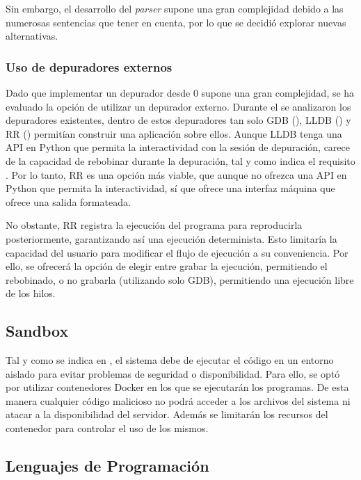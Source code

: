 Sin embargo, el desarrollo del \textit{\gls{parser}} supone una gran complejidad debido a las numerosas sentencias que tener en cuenta, por lo que se decidió explorar nuevas alternativas.

\subsubsection{Uso de depuradores externos} \label{sec:depuradores-externos}

Dado que implementar un depurador desde 0 supone una gran complejidad, se ha evaluado la opción de utilizar un depurador externo. Durante el  se analizaron los depuradores existentes, dentro de estos depuradores tan solo GDB (), LLDB () y RR () permitían construir una aplicación sobre ellos. Aunque LLDB tenga una API en Python que permita la interactividad con la sesión de depuración, carece de la capacidad de rebobinar durante la depuración, tal y como indica el requisito . Por lo tanto, RR es una opción más viable, que aunque no ofrezca una API en Python que permita la interactividad, sí que ofrece una interfaz máquina que ofrece una salida formateada.

No obstante, RR registra la ejecución del programa para reproducirla posteriormente, garantizando así una ejecución determinista. Esto limitaría la capacidad del usuario para modificar el flujo de ejecución a su conveniencia. Por ello, se ofrecerá la opción de elegir entre grabar la ejecución, permitiendo el rebobinado, o no grabarla (utilizando solo GDB), permitiendo una ejecución libre de los hilos.

\subsection{Sandbox} \label{sec:sandbox}

Tal y como se indica en , el sistema debe de ejecutar el código en un entorno aislado para evitar problemas de seguridad o disponibilidad. Para ello, se optó por utilizar contenedores Docker en los que se ejecutarán los programas. De esta manera cualquier código malicioso no podrá acceder a los archivos del sistema ni atacar a la disponibilidad del servidor. Además se limitarán los recursos del contenedor para controlar el uso de los mismos.

\subsection{Lenguajes de Programación} \label{sec:programacion}

